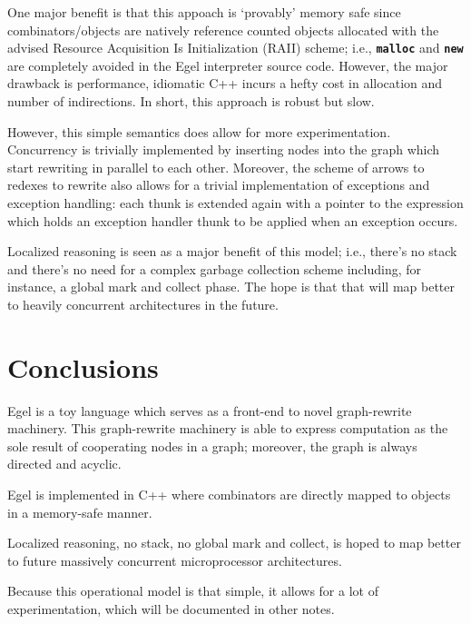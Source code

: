 \documentclass{research4cacm}
\newcommand{\code}[1]{{\bf\texttt{#1}}}
\begin{document}
One major benefit is that this appoach is `provably'
memory safe since combinators/objects are natively
reference counted objects allocated with the advised
Resource Acquisition Is Initialization (RAII) scheme; i.e.,
\code{malloc} and \code{new} are 
completely avoided in the Egel interpreter source
code. However, the major drawback is
performance, idiomatic C++ incurs a hefty cost in
allocation and number of indirections. In short,
this approach is robust but slow.

However, this simple semantics does allow for
more experimentation. Concurrency is trivially
implemented by inserting nodes into the graph
which start rewriting in parallel to each other.
Moreover, the scheme of arrows
to redexes to rewrite also allows for a
trivial implementation of exceptions and 
exception handling: each thunk is extended
again with a pointer to the expression which
holds an exception handler thunk to be applied
when an exception occurs.

Localized reasoning is seen as a major benefit
of this model; i.e., there's no stack and there's
no need for a complex garbage collection scheme
including, for instance, a global mark and collect
phase. The hope is that that will map better to 
heavily concurrent architectures in the future.

\section{Conclusions}

Egel is a toy language which serves as a front-end
to novel graph-rewrite machinery. This graph-rewrite
machinery is able to express computation as the 
sole result of cooperating nodes in a graph; moreover,
the graph is always directed and acyclic.

Egel is implemented in C++ where combinators
are directly mapped to objects in a memory-safe
manner.

Localized reasoning, no stack, no global mark and
collect, is hoped to map better to future massively
concurrent microprocessor architectures.

Because this operational model is that simple, it
allows for a lot of experimentation, which will
be documented in other notes.



\balancecolumns
\end{document}

